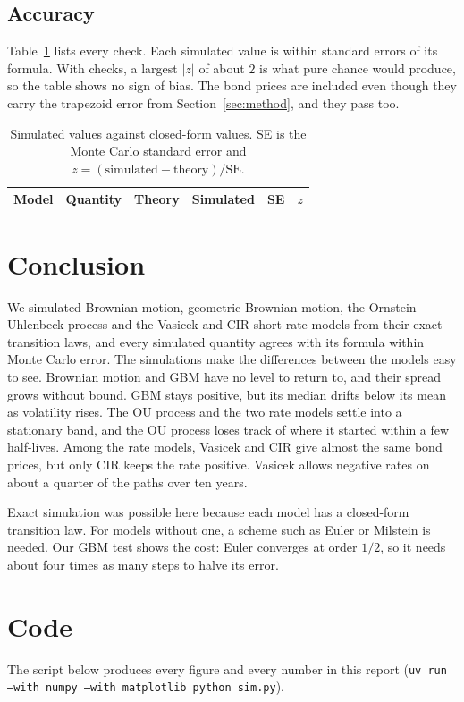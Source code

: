 \documentclass[11pt]{article}
\begin{document}
\subsection{Accuracy}

Table~\ref{tab:moments} lists every check. Each simulated value is within \MaxZ{} standard
errors of its formula. With \NChecks{} checks, a largest $|z|$ of about $2$ is what pure chance
would produce, so the table shows no sign of bias. The bond prices are included even though they
carry the trapezoid error from Section~\ref{sec:method}, and they pass too.

\begin{table}[h]
\centering\small
\caption{Simulated values against closed-form values. SE is the Monte Carlo standard error and
$z=(\text{simulated}-\text{theory})/\text{SE}$.}
\label{tab:moments}
\begin{tabular}{@{}llrrrr@{}}
\toprule
Model & Quantity & Theory & Simulated & SE & $z$ \\
\midrule

\end{tabular}
\end{table}

\section{Conclusion}
\label{sec:conclusion}

We simulated Brownian motion, geometric Brownian motion, the Ornstein--Uhlenbeck process and
the Vasicek and CIR short-rate models from their exact transition laws, and every simulated
quantity agrees with its formula within Monte Carlo error. The simulations make the differences
between the models easy to see. Brownian motion and GBM have no level to return to, and their
spread grows without bound. GBM stays positive, but its median drifts below its mean as
volatility rises. The OU process and the two rate models settle into a stationary band, and the
OU process loses track of where it started within a few half-lives. Among the rate models,
Vasicek and CIR give almost the same bond prices, but only CIR keeps the rate positive. Vasicek
allows negative rates on about a quarter of the paths over ten years.

Exact simulation was possible here because each model has a closed-form transition law. For
models without one, a scheme such as Euler or Milstein is needed. Our GBM test shows the cost:
Euler converges at order $1/2$, so it needs about four times as many steps to halve its error.




\appendix
\section{Code}
The script below produces every figure and every number in this report
(\texttt{uv run --with numpy --with matplotlib python sim.py}).

\end{document}
